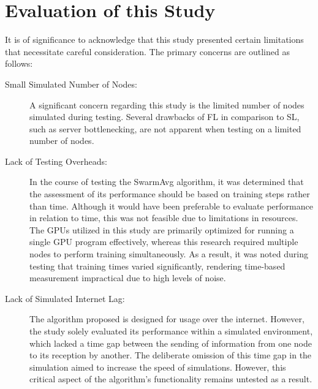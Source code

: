 \section{Evaluation of this Study}
It is of significance to acknowledge that this study presented certain limitations that necessitate careful consideration. The primary concerns are outlined as follows:

\begin{description}
	\item[Small Simulated Number of Nodes: ] A significant concern regarding this study is the limited number of nodes simulated during testing. Several drawbacks of FL in comparison to SL, such as server bottlenecking, are not apparent when testing on a limited number of nodes.
	
	\item[Lack of Testing Overheads: ] In the course of testing the SwarmAvg algorithm, it was determined that the assessment of its performance should be based on training steps rather than time. Although it would have been preferable to evaluate performance in relation to time, this was not feasible due to limitations in resources. The GPUs utilized in this study are primarily optimized for running a single GPU program effectively, whereas this research required multiple nodes to perform training simultaneously. As a result, it was noted during testing that training times varied significantly, rendering time-based measurement impractical due to high levels of noise.
	
	\item[Lack of Simulated Internet Lag: ] The algorithm proposed is designed for usage over the internet. However, the study solely evaluated its performance within a simulated environment, which lacked a time gap between the sending of information from one node to its reception by another. The deliberate omission of this time gap in the simulation aimed to increase the speed of simulations. However, this critical aspect of the algorithm's functionality remains untested as a result.
\end{description}